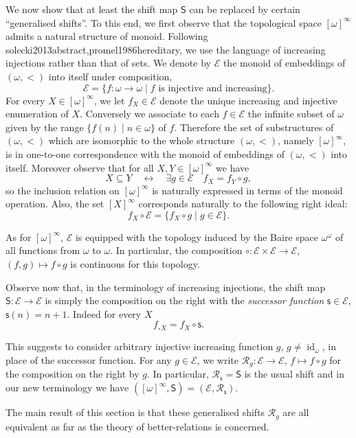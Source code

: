 \documentclass{article}%
\newcommand\textcite{}
\theoremstyle{plain}
\theoremstyle{definition}
\theoremstyle{remark}
\DeclareMathOperator{\id}{\mathrm{id}} %
\newcommand{\bai}{\omega^{\omega}}
\newcommand{\SSI}{\quad\longleftrightarrow\quad} %
\newcommand{\shift}[1]{{}_{*}#1}
\newcommand{\SHIFT}{\mathsf{S}}
\newcommand{\infSub}[1]{[#1]^{\infty}}
\newcommand{\Su}{\mathsf{s}}
\newcommand{\IIf}{\mathcal{E}}
\newcommand{\rtrans}[1]{\mathcal{R}_{#1}}
\begin{document}
We now show that at least the shift map $\SHIFT$ can be replaced by certain \enquote{generalised shifts}. To this end, we first observe that the topological space $\infSub{\omega}$ admits a natural structure of monoid. Following \textcite{solecki2013abstract,promel1986hereditary}, we use the language of increasing injections rather than that of sets.
We denote by $\IIf$ the monoid of embeddings of $(\omega,<)$ into itself under composition,
\[
\IIf=\{f:\omega\to\omega\mid \text{$f$ is injective and increasing}\}.
\]
For every $X\in\infSub{\omega}$, we let $f_{X}\in\IIf$ denote the unique increasing and injective enumeration of $X$. Conversely we associate to each $f\in \IIf$ the infinite subset of $\omega$ given by the range $\{f(n)\mid n\in\omega\}$ of $f$. Therefore the set of substructures of $(\omega,<)$ which are isomorphic to the whole structure $(\omega,<)$, namely $\infSub{\omega}$, is in one-to-one correspondence with the monoid of embeddings of $(\omega,<)$ into itself. Moreover observe that for all $X,Y\in\infSub{\omega}$ we have
\[
X\subseteq Y \SSI \exists g\in \IIf \quad f_{X}=f_{Y}\circ g,
\]
so the inclusion relation on $\infSub{\omega}$ is naturally expressed in terms of the monoid operation. Also, the set $\infSub{X}$ corresponds naturally to the following right ideal:
 \[f_{X}\circ \IIf=\{f_{X}\circ g\mid g\in \IIf\}.\]

As for $\infSub{\omega}$, $\IIf$ is equipped with the topology induced by the Baire space $\bai$ of all functions from $\omega$ to $\omega$. In particular, the composition $\circ:\IIf\times \IIf\to \IIf$, $(f,g)\mapsto f\circ g$ is continuous for this topology. 

Observe now that, in the terminology of increasing injections, the shift map $\SHIFT:\IIf\to \IIf$ is simply the composition on the right with the \emph{successor function} $\Su\in\IIf$, $\Su(n)=n+1$. Indeed for every $X$
\[
f_{\shift{X}}=f_{X}\circ \Su.
\]

This suggests to consider arbitrary injective increasing function $g$, $g\neq \id_{\omega}$, in place of the successor function. For any $g\in \IIf$, we write $\rtrans{g}:\IIf \to \IIf$, $f\mapsto f\circ g$ for the composition on the right by $g$. In particular, $\rtrans{\Su}=\SHIFT$ is the usual shift and in our new terminology we have $(\infSub{\omega},\SHIFT)=(\IIf, \rtrans{\Su})$.

The main result of this section is that these generalised shifts $\rtrans{g}$ are all equivalent as far as the theory of better-relations is concerned. 
\end{document}
